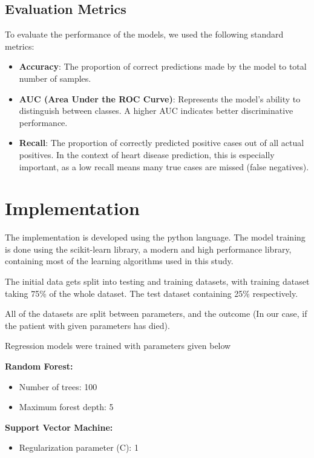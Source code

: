 \documentclass[conference]{IEEEtran}
\begin{document}
\subsection{Evaluation Metrics}
To evaluate the performance of the models, we used the following standard metrics:
\begin{itemize}
    \item \textbf{Accuracy}: The proportion of correct predictions made by the model to total number of samples.
    \item \textbf{AUC (Area Under the ROC Curve)}:  Represents the model’s ability to distinguish between classes. A higher AUC indicates better discriminative performance.
    \item \textbf{Recall}: The proportion of correctly predicted positive cases out of all actual positives. 
    In the context of heart disease prediction, this is especially important, 
    as a low recall means many true cases are missed (false negatives).
\end{itemize}


\section{Implementation}

The implementation is developed using the python language. The model training
is done using the scikit-learn library, a modern and high performance library, containing
most of the learning algorithms used in this study.

The initial data gets split into testing and training datasets, with training
dataset taking 75\% of the whole dataset. The test dataset containing 25\% respectively.

All of the datasets are split between parameters, and the outcome
(In our case, if the patient with given parameters has died).

Regression models were trained with parameters given below

\textbf{Random Forest:}
\begin{itemize}
    \item Number of trees: 100
    \item Maximum forest depth: 5
\end{itemize}

\textbf{Support Vector Machine:}
\begin{itemize}
    \item Regularization parameter (C): 1
\end{itemize}
\end{document}
